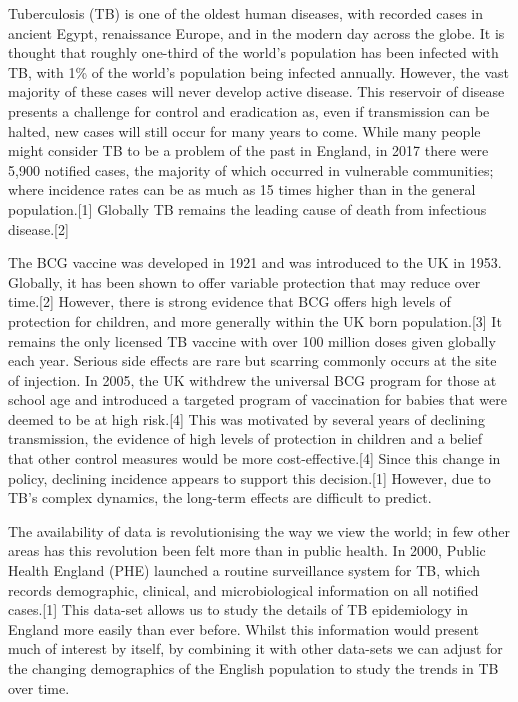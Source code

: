 \documentclass[11pt,twoside]{bristolthesis}
\begin{document}
  Tuberculosis (TB) is one of the oldest human diseases, with recorded cases in ancient Egypt, renaissance Europe, and in the modern day across the globe. It is thought that roughly one-third of the world's population has been infected with TB, with 1\% of the world's population being infected annually. However, the vast majority of these cases will never develop active disease. This reservoir of disease presents a challenge for control and eradication as, even if transmission can be halted, new cases will still occur for many years to come. While many people might consider TB to be a problem of the past in England, in 2017 there were 5,900 notified cases, the majority of which occurred in vulnerable communities; where incidence rates can be as much as 15 times higher than in the general population.{[}1{]} Globally TB remains the leading cause of death from infectious disease.{[}2{]}
  
  The BCG vaccine was developed in 1921 and was introduced to the UK in 1953. Globally, it has been shown to offer variable protection that may reduce over time.{[}2{]} However, there is strong evidence that BCG offers high levels of protection for children, and more generally within the UK born population.{[}3{]} It remains the only licensed TB vaccine with over 100 million doses given globally each year. Serious side effects are rare but scarring commonly occurs at the site of injection. In 2005, the UK withdrew the universal BCG program for those at school age and introduced a targeted program of vaccination for babies that were deemed to be at high risk.{[}4{]} This was motivated by several years of declining transmission, the evidence of high levels of protection in children and a belief that other control measures would be more cost-effective.{[}4{]} Since this change in policy, declining incidence appears to support this decision.{[}1{]} However, due to TB's complex dynamics, the long-term effects are difficult to predict.
  
  The availability of data is revolutionising the way we view the world; in few other areas has this revolution been felt more than in public health. In 2000, Public Health England (PHE) launched a routine surveillance system for TB, which records demographic, clinical, and microbiological information on all notified cases.{[}1{]} This data-set allows us to study the details of TB epidemiology in England more easily than ever before. Whilst this information would present much of interest by itself, by combining it with other data-sets we can adjust for the changing demographics of the English population to study the trends in TB over time.
  
\end{document}
